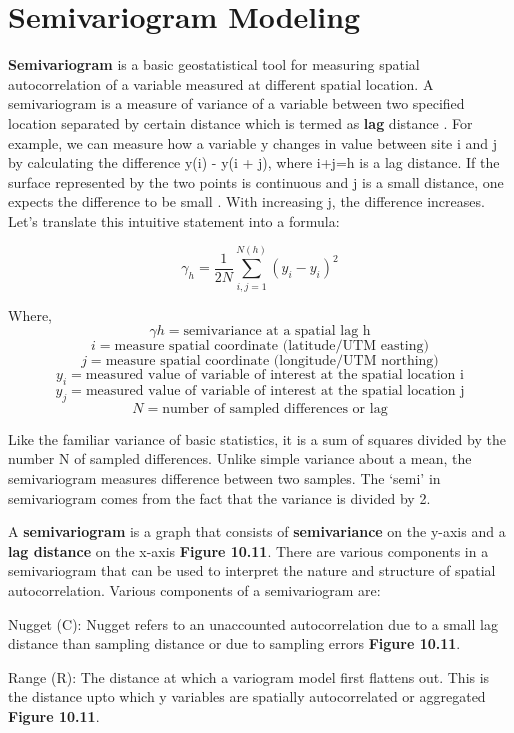 \documentclass[
]{book}
\begin{document}
\hypertarget{semivariogram-modeling}{%
\section{Semivariogram Modeling}\label{semivariogram-modeling}}

\textbf{Semivariogram} is a basic geostatistical tool for measuring spatial autocorrelation of a variable measured at different spatial location. A semivariogram is a measure of variance of a variable between two specified location separated by certain distance which is termed as \textbf{lag} distance \citep{Hohn1989}. For example, we can measure how a variable y changes in value between site i and j by calculating the difference y(i) - y(i + j), where i+j=h is a lag distance. If the surface represented by the two points is continuous and j is a small distance, one expects the difference to be small \citep{Hohn1989}. With increasing j, the difference increases. Let's translate this intuitive statement into a formula:

\[\gamma_{h}= \frac{1}{2N} \sum_{i,j= 1}^{N(h)}{({y_i} - y_i)}^2\]

Where, \[\gamma{h}=\text{semivariance at a spatial lag h}\]
\[ i=\text{measure spatial coordinate (latitude/UTM easting)}\]
\[ j=\text{measure spatial coordinate (longitude/UTM northing)}\]
\[y_{i}=\text{measured value of variable of interest at the spatial location i} \]
\[y_{j}=\text{measured value of variable of interest at the spatial location j} \]
\[N=\text{number of sampled differences or lag} \]

Like the familiar variance of basic statistics, it is a sum of squares divided by the number N of sampled differences. Unlike simple variance about a mean, the semivariogram measures difference between two samples. The `semi' in semivariogram comes from the fact that the variance is divided by 2.

A \textbf{semivariogram} is a graph that consists of \textbf{semivariance} on the y-axis and a \textbf{lag distance} on the x-axis \textbf{Figure 10.11}. There are various components in a semivariogram that can be used to interpret the nature and structure of spatial autocorrelation. Various components of a semivariogram are:

Nugget (C): Nugget refers to an unaccounted autocorrelation due to a small lag distance than sampling distance or due to sampling errors \textbf{Figure 10.11}.

Range (R): The distance at which a variogram model first flattens out. This is the distance upto which y variables are spatially autocorrelated or aggregated \textbf{Figure 10.11}.
\end{document}
